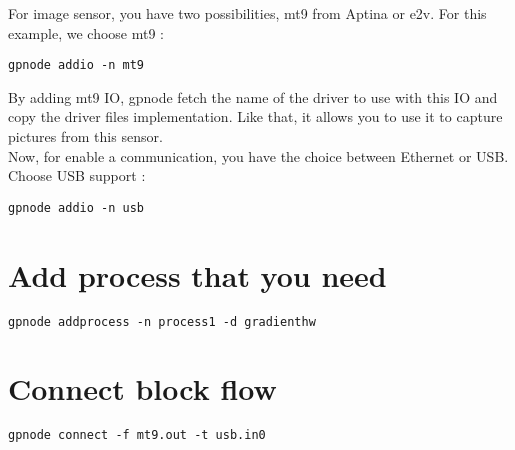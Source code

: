 \documentclass[10pt,a4paper]{article}
\begin{document}
For image sensor, you have two possibilities, mt9 from Aptina or e2v. For this example, we choose mt9 :
\begin{Verbatim}[frame=single]
gpnode addio -n mt9
\end{Verbatim}
By adding mt9 IO, gpnode fetch the name of the driver to use with this IO and copy the driver files implementation. Like that, it allows you to use it to capture pictures from this sensor.\\

Now, for enable a communication, you have the choice between Ethernet or USB. Choose USB support :
\begin{Verbatim}[frame=single]
gpnode addio -n usb
\end{Verbatim}

\section{Add process that you need}
\begin{Verbatim}[frame=single]
gpnode addprocess -n process1 -d gradienthw
\end{Verbatim}

\section{Connect block flow}
\begin{Verbatim}[frame=single]
gpnode connect -f mt9.out -t usb.in0
\end{Verbatim}
\end{document}
